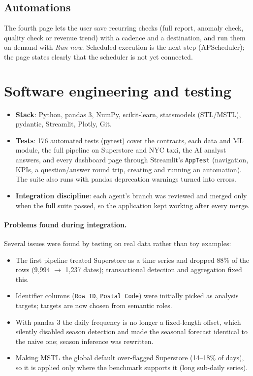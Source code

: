 \documentclass[11pt,a4paper]{article}
\newcommand{\code}[1]{\texttt{#1}}
\begin{document}
\subsection{Automations}
The fourth page lets the user save recurring checks (full report, anomaly check, quality check or revenue trend)
with a cadence and a destination, and run them on demand with \emph{Run now}. Scheduled execution is the next
step (APScheduler); the page states clearly that the scheduler is not yet connected.

\section{Software engineering and testing}

\begin{itemize}
  \item \textbf{Stack}: Python, pandas 3, NumPy, scikit-learn, statsmodels (STL/MSTL), pydantic, Streamlit,
        Plotly, Git.
  \item \textbf{Tests}: 176 automated tests (pytest) cover the contracts, each data and ML module, the full
        pipeline on Superstore and NYC taxi, the AI analyst answers, and every dashboard page through Streamlit's
        \code{AppTest} (navigation, KPIs, a question/answer round trip, creating and running an automation).
        The suite also runs with pandas deprecation warnings turned into errors.
  \item \textbf{Integration discipline}: each agent's branch was reviewed and merged only when the full suite
        passed, so the application kept working after every merge.
\end{itemize}

\paragraph{Problems found during integration.} Several issues were found by testing on real data rather than toy
examples:
\begin{itemize}
  \item The first pipeline treated Superstore as a time series and dropped 88\% of the rows (9{,}994 $\to$ 1{,}237
        dates); transactional detection and aggregation fixed this.
  \item Identifier columns (\code{Row ID}, \code{Postal Code}) were initially picked as analysis targets;
        targets are now chosen from semantic roles.
  \item With pandas 3 the daily frequency is no longer a fixed-length offset, which silently disabled season
        detection and made the seasonal forecast identical to the naive one; season inference was rewritten.
  \item Making MSTL the global default over-flagged Superstore (14--18\% of days), so it is applied only where the
        benchmark supports it (long sub-daily series).
\end{itemize}
\end{document}
